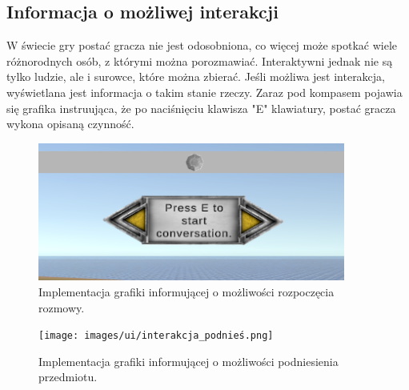 \subsection{Informacja o możliwej interakcji}
W świecie gry postać gracza nie jest odosobniona, co więcej może spotkać wiele różnorodnych osób, z którymi można porozmawiać. Interaktywni
jednak nie są tylko ludzie, ale i surowce, które można zbierać. Jeśli możliwa jest interakcja,  wyświetlana jest informacja o takim stanie
 rzeczy. Zaraz pod kompasem pojawia się grafika instruująca, że po naciśnięciu klawisza "E" klawiatury, postać gracza wykona opisaną czynność.
 \begin{figure}[htbp]
    \centering
    \includegraphics[width=0.9\textwidth]{images/ui/interakcja_rozmowa.png}
    \caption{Implementacja grafiki informującej o możliwości rozpoczęcia rozmowy.}\label{fig:rozmow}
\end{figure}
\begin{figure}[htbp]
    \centering
    \texttt{[image: images/ui/interakcja\_podnieś.png]}
    \caption{Implementacja grafiki informującej o możliwości podniesienia przedmiotu.}\label{fig:przedmio}
\end{figure}
\FloatBarrier

